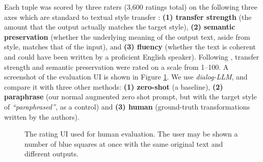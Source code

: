 Each tuple was scored by three raters (3,600 ratings total) on the following three axes which are standard to textual style transfer \citep{DBLP:journals/corr/abs-1904-02295}: \textbf{(1) transfer strength} (the amount that the output actually matches the target style), \textbf{(2) semantic preservation} (whether the underlying meaning of the output text, aside from style, matches that of the input), and \textbf{(3) fluency} (whether the text is coherent and could have been written by a proficient English speaker). Following \citet{sakaguchi-van-durme-2018-efficient}, transfer strength and semantic preservation were rated on a scale from 1--100. A screenshot of the evaluation UI is shown in Figure \ref{fig:rater_ui}.
We use \textit{dialog-LLM}, and compare it with three other methods: \textbf{(1) zero-shot} (a baseline), \textbf{(2) paraphrase} (our normal augmented zero shot prompt, but with the target style of \textit{``paraphrased''}, as a control) and \textbf{(3) human} (ground-truth transformations written by the authors).

\begin{figure}[!htb]
  \centering
  \caption{The rating UI used for human evaluation. The user may be shown a number of blue squares at once with the same original text and different outputs.}
  \label{fig:rater_ui}
\end{figure} 

